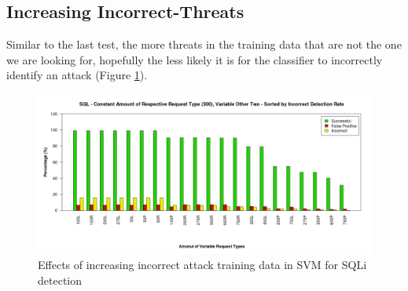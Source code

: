 \newpage
\subsection{Increasing Incorrect-Threats} \label{sec:resIncorrect}

Similar to the last test, the more threats in the training data that are not the one we are looking for, hopefully the less likely it is for the classifier to incorrectly identify an attack (Figure \ref{fig:resIncorrect}).

\begin{figure}[hb]
	\centering
	\includegraphics[width=450px]{./assets/results/svm/incorrect/Results_SQL.png}
	\caption{Effects of increasing incorrect attack training data in SVM for SQLi detection}
	\label{fig:resIncorrect}
\end{figure}


